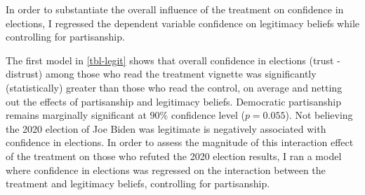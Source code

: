 \documentclass[
  12pt,
  letterpaper,
]{article}
\begin{document}
In order to substantiate the overall influence of the treatment on
confidence in elections, I regressed the dependent variable confidence
on legitimacy beliefs while controlling for partisanship.

\begin{table}[H]

\caption{\label{tbl-legit}Confidence in Elections by Treatment and
Legitimacy Beliefs}


\end{table}%

The first model in \ref{tbl-legit} shows that overall confidence in
elections (trust - distrust) among those who read the treatment vignette
was significantly (statistically) greater than those who read the
control, on average and netting out the effects of partisanship and
legitimacy beliefs. Democratic partisanship remains marginally
significant at \(90\%\) confidence level (\(p = 0.055\)). Not believing
the 2020 election of Joe Biden was legitimate is negatively associated
with confidence in elections. In order to assess the magnitude of this
interaction effect of the treatment on those who refuted the 2020
election results, I ran a model where confidence in elections was
regressed on the interaction between the treatment and legitimacy
beliefs, controlling for partisanship.
\end{document}
